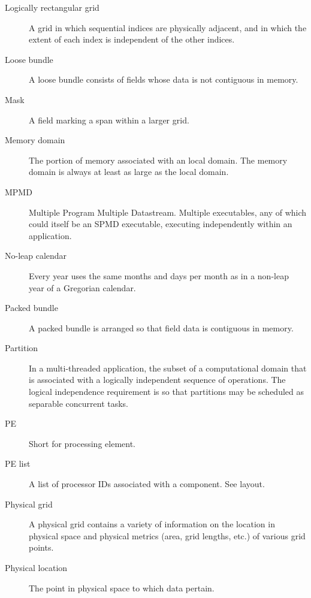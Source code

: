 \begin{description}
\item[Logically rectangular grid] \label{glos:RecGrid} A grid in 
  which sequential indices are physically adjacent, and in which the 
  extent of each index is independent of the other indices.

\item[Loose bundle] \label{glos:LooseBundle} A loose bundle consists of 
  fields whose data is not contiguous in memory.

\item[Mask] \label{glos:Mask} A field marking a span within a larger grid.

\item[Memory domain] \label{glos:MemDomain} The portion of memory 
  associated with an local domain.  The memory domain is always at least 
  as large as the local domain.

\item[MPMD] \label{glos:MPMD} Multiple Program Multiple Datastream.
  Multiple executables, any of which could itself be an SPMD
  executable, executing independently within an application.

\item [No-leap calendar] \label{glos:NoLeap} Every year uses the same months 
and days per month as in a non-leap year of a Gregorian calendar.

\item[Packed bundle] \label{glos:PackedBundle} A packed bundle is arranged
  so that field data is contiguous in memory.

\item[Partition] \label{glos:Partition} In a multi-threaded application, the subset of a
  computational domain that is associated with a logically independent
  sequence of operations. The logical independence requirement is so
  that partitions may be scheduled as separable concurrent tasks.

\item[PE] \label{glos:PE} Short for processing element.

\item[PE list] \label{glos:PElist} A list of processor IDs associated 
  with a component.  See layout.

\item[Physical grid] \label{term:PhysGrid} 
  A physical grid contains a variety of information
  on the location in physical space and physical metrics (area,
  grid lengths, etc.) of various grid points.

\item[Physical location] \label{glos:PhysLoc} The point in physical space 
  to which data pertain. 


\end{description}
